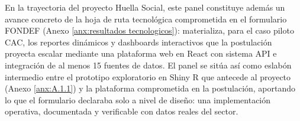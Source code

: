 En la trayectoria del proyecto Huella Social, este panel constituye además un avance concreto de la hoja de ruta tecnológica comprometida en el formulario FONDEF (Anexo \ref{anx:resultados tecnologicos}): materializa, para el caso piloto CAC, los reportes dinámicos y dashboards interactivos que la postulación proyecta escalar mediante una plataforma web en React con sistema API e integración de al menos 15 fuentes de datos. El panel se sitúa así como eslabón intermedio entre el prototipo exploratorio en Shiny R que antecede al proyecto (Anexo \ref{anx:A.1.1}) y la plataforma comprometida en la postulación, aportando lo que el formulario declaraba solo a nivel de diseño: una implementación operativa, documentada y verificable con datos reales del sector.
